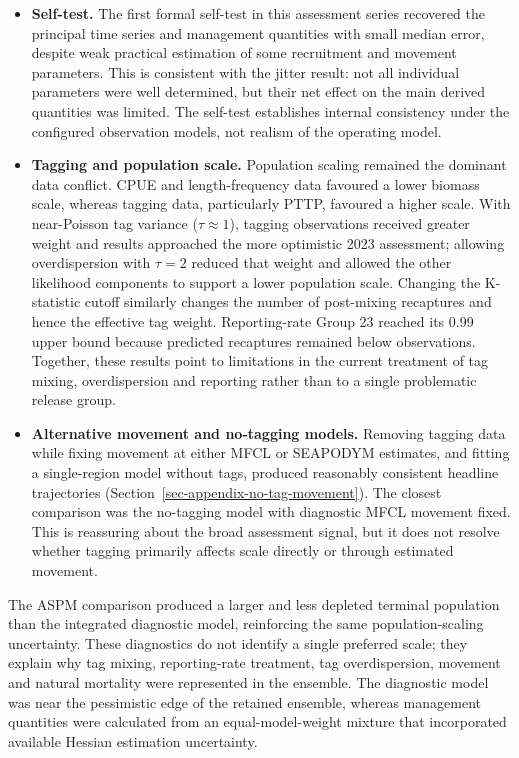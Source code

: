 \documentclass[
  english,
  a4paper,
  a4paper,
  11pt]{SCreport}
\begin{document}
\begin{itemize}
  distribution supplied an empirical scale for the cap, while the
  integrated fit determined the final choice.
\item
  \textbf{Self-test.} The first formal self-test in this assessment
  series recovered the principal time series and management quantities
  with small median error, despite weak practical estimation of some
  recruitment and movement parameters. This is consistent with the
  jitter result: not all individual parameters were well determined, but
  their net effect on the main derived quantities was limited. The
  self-test establishes internal consistency under the configured
  observation models, not realism of the operating model.
\item
  \textbf{Tagging and population scale.} Population scaling remained the
  dominant data conflict. CPUE and length-frequency data favoured a
  lower biomass scale, whereas tagging data, particularly PTTP, favoured
  a higher scale. With near-Poisson tag variance (\(\tau\approx1\)),
  tagging observations received greater weight and results approached
  the more optimistic 2023 assessment; allowing overdispersion with
  \(\tau=2\) reduced that weight and allowed the other likelihood
  components to support a lower population scale. Changing the
  K-statistic cutoff similarly changes the number of post-mixing
  recaptures and hence the effective tag weight. Reporting-rate Group 23
  reached its 0.99 upper bound because predicted recaptures remained
  below observations. Together, these results point to limitations in
  the current treatment of tag mixing, overdispersion and reporting
  rather than to a single problematic release group.
\item
  \textbf{Alternative movement and no-tagging models.} Removing tagging
  data while fixing movement at either MFCL or SEAPODYM estimates, and
  fitting a single-region model without tags, produced reasonably
  consistent headline trajectories
  (Section~\ref{sec-appendix-no-tag-movement}). The closest comparison
  was the no-tagging model with diagnostic MFCL movement fixed. This is
  reassuring about the broad assessment signal, but it does not resolve
  whether tagging primarily affects scale directly or through estimated
  movement.
\end{itemize}

The ASPM comparison produced a larger and less depleted terminal
population than the integrated diagnostic model, reinforcing the same
population-scaling uncertainty. These diagnostics do not identify a
single preferred scale; they explain why tag mixing, reporting-rate
treatment, tag overdispersion, movement and natural mortality were
represented in the ensemble. The diagnostic model was near the
pessimistic edge of the retained ensemble, whereas management quantities
were calculated from an equal-model-weight mixture that incorporated
available Hessian estimation uncertainty.
\end{document}
